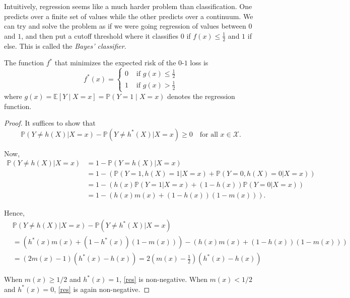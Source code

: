Intuitively, regression seems like a much harder problem than classification. One predicts over a finite set of values while the other predicts over a continuum. We can try and solve the problem as if we were going regression of values between $0$ and $1$, and then put a cutoff threshold where it classifies $0$ if $f(x) \leq \frac{1}{2}$ and $1$ if else. This is called the \textit{Bayes' classifier}. 

\begin{theorem}
  \label{thm:bayes_optimality}
  The function $f^\ast$ that minimizes the expected risk of the $0$-$1$ loss is 
  \begin{equation}
    f^\ast(x) = \begin{cases} 
      0 & \text{ if } g(x) \leq \frac{1}{2} \\ 
      1 & \text{ if } g(x) > \frac{1}{2} 
    \end{cases}
  \end{equation}
  where $g(x) = \mathbb{E}[Y \mid X = x] = \mathbb{P}(Y = 1 \mid X = x)$ denotes the regression function. 
\end{theorem}
\begin{proof}
  It suffices to show that
  \begin{equation}
    \mathbb{P}(Y \neq h(X)|X = x) - \mathbb{P}(Y \neq h^*(X)|X = x) \geq 0 \quad \text{for all } x \in \mathcal{X}.
  \end{equation}
  
  Now,
  \begin{align}
    \mathbb{P}(Y \neq h(X)|X = x) &= 1 - \mathbb{P}(Y = h(X)|X = x) \\
    &= 1 - \left(\mathbb{P}(Y = 1, h(X) = 1|X = x) + \mathbb{P}(Y = 0, h(X) = 0|X = x)\right) \\
    &= 1 - \left(h(x)\mathbb{P}(Y = 1|X = x) + (1 - h(x))\mathbb{P}(Y = 0|X = x)\right) \\
    &= 1 - \left(h(x)m(x) + (1 - h(x))(1 - m(x))\right).
  \end{align}
  
  Hence,
  \begin{align}
    &\mathbb{P}(Y \neq h(X)|X = x) - \mathbb{P}(Y \neq h^*(X)|X = x) \\
    &= \left(h^*(x)m(x) + (1 - h^*(x))(1 - m(x))\right) - \left(h(x)m(x) + (1 - h(x))(1 - m(x))\right) \\
    &= (2m(x) - 1)(h^*(x) - h(x)) = 2\left(m(x) - \frac{1}{2}\right)(h^*(x) - h(x)) \label{res}
  \end{align}
  
  When $m(x) \geq 1/2$ and $h^*(x) = 1$, \eqref{res} is non-negative. When $m(x) < 1/2$ and $h^*(x) = 0$, \eqref{res} is again non-negative. 
\end{proof}

